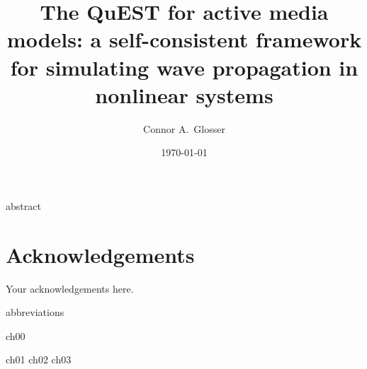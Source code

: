 \documentclass[mixedtoc]{msu-thesis-custom}
\title{The QuEST for active media models: a self-consistent framework for simulating wave propagation in nonlinear systems}
\author{Connor A.\ Glosser}
\date{\today}
\begin{document}
\frontmatter
\maketitlepage

{abstract}

\clearpage

\makecopyrightpage

%
%
\clearpage
\chapter*{Acknowledgements}
\DoubleSpacing %
Your acknowledgements here.
%
\clearpage
\SingleSpacing
\tableofcontents* %
\clearpage
\listoftables %
\clearpage
\listoffigures %

%
\makenomenclature
{abbreviations}

\mainmatter
%

{ch00}

{ch01}
{ch02}
{ch03}
\end{document}
